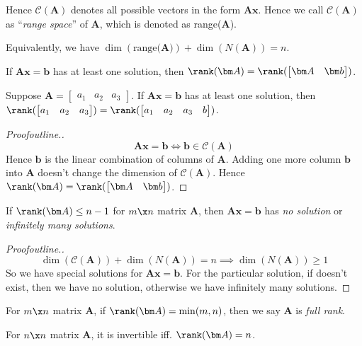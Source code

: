 Hence $\mathcal{C}(\bm A)$ denotes all possible vectors in the form $\bm{Ax}$. Hence we call $\mathcal{C}(\bm A)$ as ``\emph{range space}'' of $\bm A$, which is denoted as range($\bm A$).

Equivalently, we have $\dim(\text{range($\bm A$)}) + \dim(N(\bm A)) = n$.
\begin{proposition}
If $\bm{Ax} = \bm b$ has at least one solution, then $\rank(\bm A) = \rank(\begin{bmatrix}
\bm A&\bm b
\end{bmatrix})$.
\end{proposition}
\begin{example}
Suppose $\bm A = \begin{bmatrix}
a_1&a_2&a_3
\end{bmatrix}$. If $\bm{Ax} = \bm b$ has at least one solution, then $\rank(\begin{bmatrix}
a_1&a_2&a_3
\end{bmatrix}) = \rank(\begin{bmatrix}
a_1&a_2&a_3&b
\end{bmatrix})$.
\end{example}
\begin{proof}[Proofoutline.]
\[
\bm{Ax} = \bm b\Longleftrightarrow \bm b\in\mathcal{C}(\bm A)
\]
Hence $\bm b$ is the linear combination of columns of $\bm A$. Adding one more column $\bm b$ into $\bm A$ doesn't change the dimension of $\mathcal{C}(\bm A)$. Hence $\rank(\bm A) = \rank(\begin{bmatrix}
\bm A&\bm b
\end{bmatrix})$.
\end{proof}
\begin{proposition}
If $\rank(\bm A)\le n-1$ for $m\x n$ matrix $\bm A$, then $\bm{Ax} = \bm b$ has \emph{no solution} or \emph{infinitely many solutions}.
\end{proposition}
\begin{proof}[Proofoutline.]
\[
\dim(\mathcal{C}(\bm A))+\dim(N(\bm A)) = n
\implies \dim(N(\bm A))\ge 1
\]
So we have special solutions for $\bm{Ax} = \bm b$. For the particular solution, if doesn't exist, then we have no solution, otherwise we have infinitely many solutions.
\end{proof}
\begin{definition}
For $m\x n$ matrix $\bm A$, if $\rank(\bm A) = \min(m,n)$, then we say $\bm A$ is \emph{full rank}.
\end{definition}
\begin{theorem}
For $n\x n$ matrix $\bm A$, it is invertible iff. $\rank(\bm A) = n$.
\end{theorem}

